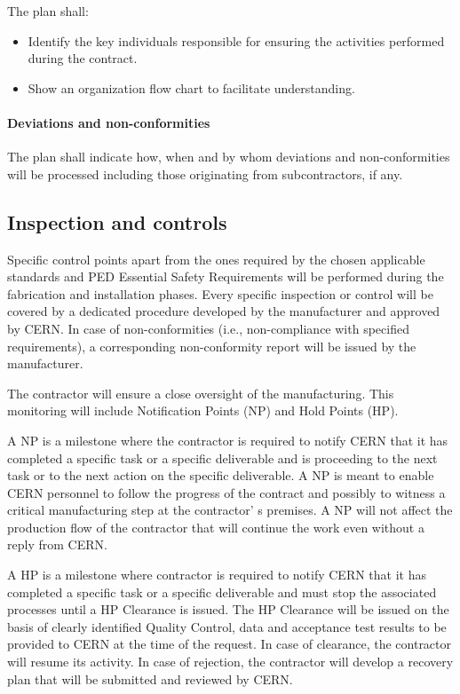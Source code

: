 The plan shall:
\begin{itemize}
\item Identify the key individuals responsible for ensuring the activities performed during the contract.
\item Show an organization flow chart to facilitate understanding.
\end{itemize}

\paragraph{Deviations and non-conformities}

The plan shall indicate how, when and by whom deviations and non-conformities will be processed including those originating from subcontractors, if any.

\subsection{Inspection and controls}

Specific control points apart from the ones required by the chosen applicable standards and PED Essential Safety Requirements
 will be performed during the fabrication and installation phases. Every specific inspection or control will be covered by a dedicated procedure developed by the manufacturer and approved by CERN. In case of non-conformities (i.e., non-compliance with specified requirements), a corresponding non-conformity report will be issued by the manufacturer.

The contractor will ensure a close oversight of the manufacturing. This monitoring will include Notification Points (NP) and Hold Points (HP).

A NP is a milestone where the contractor is required to notify CERN that it has completed a specific task or a specific deliverable and is proceeding to the next task or to the next action on the specific deliverable. A NP is meant to enable CERN personnel to follow the progress of the contract and possibly to witness a critical manufacturing step at the contractor' s premises. A NP will not affect the production flow of the contractor that will continue the work even without a reply from CERN. 

A HP is a milestone where contractor is required to notify CERN that it has completed a specific task or a specific deliverable and must stop the associated processes until a HP Clearance is issued. The HP Clearance will be issued on the basis of clearly identified Quality Control, data and acceptance test results to be provided to CERN at the time of the request. In case of clearance, the contractor will resume its activity. In case of rejection, the contractor will develop a recovery plan that will be submitted and reviewed by CERN.

